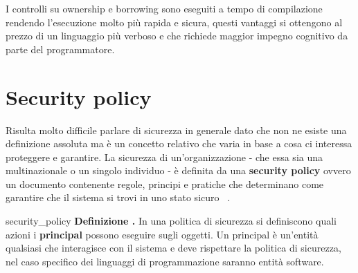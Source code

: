 \documentclass[Lau,binding=0.6cm]{sapthesis}
\newenvironment{myDefinition}[2]{ \begin{Definizione}[adjusted title=#1]{}{#2}
    \textbf{Definizione \thetcbcounter.} }{\end{Definizione}}
\begin{document}


I controlli su ownership e borrowing sono eseguiti a tempo di compilazione rendendo l'esecuzione molto più rapida e sicura, questi vantaggi si ottengono al prezzo di un linguaggio più verboso e che richiede maggior impegno cognitivo da parte del programmatore. 


\chapter{Security policy}

Risulta molto difficile parlare di sicurezza in generale dato che non ne esiste una definizione assoluta ma è un concetto relativo che varia in base a cosa ci interessa proteggere e garantire. La sicurezza di un'organizzazione - che essa sia una multinazionale o un singolo individuo - è definita da una \textbf{security policy}  ovvero un documento contenente regole, principi e pratiche che determinano come garantire che il sistema si trovi in uno stato sicuro ~\cite{milner:type_polymorphism}. 

\begin{myDefinition}{Security policy}{security_policy}
    In una politica di sicurezza si definiscono quali azioni i \textbf{principal} possono eseguire sugli oggetti. Un principal è un'entità qualsiasi che interagisce con il sistema e deve rispettare la politica di sicurezza, nel caso specifico dei linguaggi di programmazione saranno entità software.
\end{myDefinition}
\end{document}
